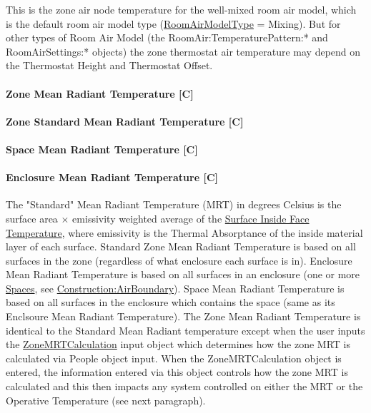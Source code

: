 This is the zone air node temperature for the well-mixed room air model, which is the default room air model type (\hyperref[roomairmodeltype]{RoomAirModelType} = Mixing). But for other types of Room Air Model (the RoomAir:TemperaturePattern:* and RoomAirSettings:* objects) the zone thermostat air temperature may depend on the Thermostat Height and Thermostat Offset.

\paragraph{Zone Mean Radiant Temperature {[}C{]}}\label{zone-mean-radiant-temperature-c}
\paragraph{Zone Standard Mean Radiant Temperature {[}C{]}}\label{zone-standard-mean-radiant-temperature-c}
\paragraph{Space Mean Radiant Temperature {[}C{]}}\label{space-mean-radiant-temperature-c}
\paragraph{Enclosure Mean Radiant Temperature {[}C{]}}\label{enclosure-mean-radiant-temperature-c}

The "Standard" Mean Radiant Temperature (MRT) in degrees Celsius is the surface area $\times$ emissivity weighted average of the \hyperref[surface-inside-face-temperature-c]{Surface Inside Face Temperature}, where emissivity is the Thermal Absorptance of the inside material layer of each surface. Standard Zone Mean Radiant Temperature is based on all surfaces in the zone (regardless of what enclosure each surface is in). Enclosure Mean Radiant Temperature is based on all surfaces in an enclosure (one or more \hyperref[space]{Spaces}, see \hyperref[constructionairboundary]{Construction:AirBoundary}). Space Mean Radiant Temperature is based on all surfaces in the enclosure which contains the space (same as its Enclsoure Mean Radiant Temperature).  The Zone Mean Radiant Temperature is identical to the Standard Mean Radiant temperature except when the user inputs the \hyperref[zonemrtcalculation]{ZoneMRTCalculation} input object which determines how the zone MRT is calculated via People object input. When the ZoneMRTCalculation object is entered, the information entered via this object controls how the zone MRT is calculated and this then impacts any system controlled on either the MRT or the Operative Temperature (see next paragraph).

